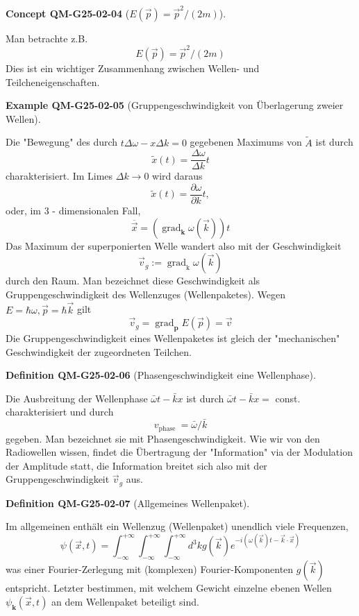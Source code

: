 \documentclass[10pt, letterpaper]{article}
\newcommand{\CustomHeading}[3]{%
  \par\medskip\noindent%
  \textbf{#1 #2} \textnormal{(#3)}.\enskip%
}
\newenvironment{DEF}[2]{\CustomHeading{Definition}{#1}{#2}}{}
\newenvironment{EXA}[2]{\CustomHeading{Example}{#1}{#2}}{}
\newenvironment{CONC}[2]{\CustomHeading{Concept}{#1}{#2}}{}
\begin{document}
\begin{CONC}{QM-G25-02-04}{$E(\vec{p})=\vec{p}^{2} /(2 m)$}
Man betrachte z.B. 
$$E(\vec{p})=\vec{p}^{2} /(2 m)$$ 
Dies ist ein wichtiger Zusammenhang zwischen Wellen- und Teilcheneigenschaften.
\end{CONC}

\begin{EXA}{QM-G25-02-05}{Gruppengeschwindigkeit von Überlagerung zweier Wellen}
Die "Bewegung" des durch $t \Delta \omega-x \Delta k=0$ gegebenen Maximums von $\tilde{A}$ ist durch
$$
\tilde{x}(t)=\frac{\Delta \omega}{\Delta k} t
$$
charakterisiert. Im Limes $\Delta k \rightarrow 0$ wird daraus
$$
\tilde{x}(t)=\frac{\partial \omega}{\partial k} t,
$$
oder, im 3 - dimensionalen Fall,
$$
\overline{\vec{x}}=\left(\operatorname{grad}_{\mathbf{k}} \omega(\vec{k})\right) t
$$
Das Maximum der superponierten Welle wandert also mit der Geschwindigkeit
$$
\vec{v}_{g}:=\operatorname{grad}_{\mathrm{k}} \omega(\vec{k})
$$
durch den Raum. Man bezeichnet diese Geschwindigkeit als Gruppengeschwindigkeit des Wellenzuges (Wellenpaketes).
Wegen $E=\hbar \omega, \vec{p}=\hbar \vec{k}$ gilt
$$
\vec{v}_{g}=\operatorname{grad}_{\mathbf{p}} E(\vec{p})=\vec{v}
$$
Die Gruppengeschwindigkeit eines Wellenpaketes ist gleich der "mechanischen" Geschwindigkeit der zugeordneten Teilchen.
\end{EXA}

\begin{DEF}{QM-G25-02-06}{Phasengeschwindigkeit eine Wellenphase}
Die Ausbreitung der Wellenphase $\bar{\omega} t-\bar{k} x$ ist durch $\bar{\omega} t-\bar{k} x=$ const. charakterisiert und durch 
$$v_{\text {phase }}=\bar{\omega} / \bar{k}$$ 
gegeben. Man bezeichnet sie mit Phasengeschwindigkeit. Wie wir von den Radiowellen wissen, findet die Übertragung der "Information" via der Modulation der Amplitude statt, die Information breitet sich also mit der Gruppengeschwindigkeit $\vec{v}_{g}$ aus.
\end{DEF}

\begin{DEF}{QM-G25-02-07}{Allgemeines Wellenpaket}
Im allgemeinen enthält ein Wellenzug (Wellenpaket) unendlich viele Frequenzen,
$$
\psi(\vec{x}, t)=\int_{-\infty}^{+\infty} \int_{-\infty}^{+\infty} \int_{-\infty}^{+\infty} d^{3} k g(\vec{k}) e^{-i(\omega(\vec{k}) t-\vec{k} \cdot \vec{x})}
$$
was einer Fourier-Zerlegung mit (komplexen) Fourier-Komponenten $g(\vec{k})$ entspricht. Letzter bestimmen, mit welchem Gewicht einzelne ebenen Wellen $\psi_{\mathbf{k}}(\vec{x}, t)$ an dem Wellenpaket beteiligt sind.
\end{DEF}
\end{document}

